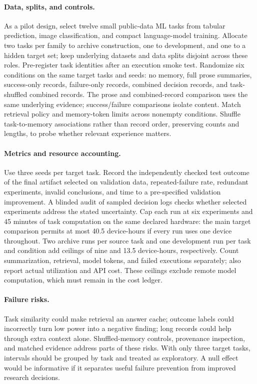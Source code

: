 \paragraph{Data, splits, and controls.}
As a pilot design, select twelve small public-data ML tasks from tabular prediction, image classification, and compact language-model training. Allocate two tasks per family to archive construction, one to development, and one to a hidden target set; keep underlying datasets and data splits disjoint across these roles. Pre-register task identities after an execution smoke test. Randomize six conditions on the same target tasks and seeds: no memory, full prose summaries, success-only records, failure-only records, combined decision records, and task-shuffled combined records. The prose and combined-record comparison uses the same underlying evidence; success/failure comparisons isolate content. Match retrieval policy and memory-token limits across nonempty conditions. Shuffle task-to-memory associations rather than record order, preserving counts and lengths, to probe whether relevant experience matters.

\paragraph{Metrics and resource accounting.}
Use three seeds per target task. Record the independently checked test outcome of the final artifact selected on validation data, repeated-failure rate, redundant experiments, invalid conclusions, and time to a pre-specified validation improvement. A blinded audit of sampled decision logs checks whether selected experiments address the stated uncertainty. Cap each run at six experiments and 45 minutes of task computation on the same declared hardware: the main target comparison permits at most 40.5 device-hours if every run uses one device throughout. Two archive runs per source task and one development run per task and condition add ceilings of nine and 13.5 device-hours, respectively. Count summarization, retrieval, model tokens, and failed executions separately; also report actual utilization and API cost. These ceilings exclude remote model computation, which must remain in the cost ledger.

\paragraph{Failure risks.}
Task similarity could make retrieval an answer cache; outcome labels could incorrectly turn low power into a negative finding; long records could help through extra context alone. Shuffled-memory controls, provenance inspection, and matched evidence address parts of these risks. With only three target tasks, intervals should be grouped by task and treated as exploratory. A null effect would be informative if it separates useful failure prevention from improved research decisions.


